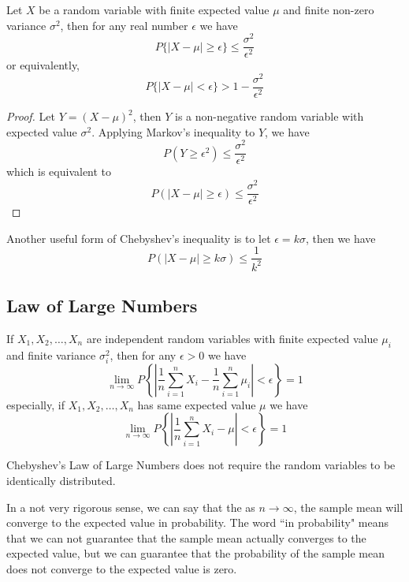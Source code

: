 \documentclass{template}
\begin{document}
\begin{theorem}
	Let $X$ be a random variable with finite expected value $\mu$ and finite non-zero variance $\sigma^2$, then
	for any real number $\epsilon$ we have
	 \[
		 P\{|X-\mu| \geq \epsilon\} \leq \frac{\sigma^2}{\epsilon^2}
	\] 
	or equivalently,
	\[
		P\{|X-\mu| < \epsilon\} > 1 - \frac{\sigma^2}{\epsilon^2}
	\] 
\end{theorem}
\begin{proof}
	Let $Y = (X-\mu)^2$, then $Y$ is a non-negative random variable with expected value $\sigma^2$.
	Applying Markov's inequality to $Y$, we have
	\[
		P(Y \geq \epsilon^2) \leq \frac{\sigma^2}{\epsilon^2}
	\] 
	which is equivalent to
	\[
		P(|X-\mu| \geq \epsilon) \leq \frac{\sigma^2}{\epsilon^2}
	\]
\end{proof}
\begin{remark}
	Another useful form of Chebyshev's inequality is to let $\epsilon = k\sigma$, then we have
	\[
		P(|X-\mu| \geq k\sigma) \leq \frac{1}{k^2}
	\] 
\end{remark}


\subsection{Law of Large Numbers}
\begin{theorem}
	If $X_1, X_2, \ldots, X_n$ are independent random variables with finite expected value $\mu_i$ and
	finite variance $\sigma_i^2$, then for any $\epsilon > 0$ we have
	\[
		\lim_{n \to \infty} P\left\{\left|\frac{1}{n}\sum_{i=1}^{n} X_i - \frac{1}{n}\sum_{i=1}^{n} \mu_i\right| < \epsilon\right\} = 1
	\]
	especially, if $X_1, X_2, \ldots, X_n$ has same expected value $\mu$ we have
	\[
		\lim_{n \to \infty} P\left\{\left|\frac{1}{n}\sum_{i=1}^{n} X_i - \mu\right| < \epsilon\right\} = 1
	\]
	\begin{remark}
		Chebyshev's Law of Large Numbers does not require the random variables to be
		identically distributed.
	\end{remark}
	\begin{remark}
		In a not very rigorous sense, we can say that the as $n \to \infty$, the sample
		mean will converge to the expected value in probability. The word
	  ``in probability" means that we can not guarantee that the sample mean actually
		converges to the expected value, but we can guarantee that the probability of
		the sample mean does not converge to the expected value is zero.
	\end{remark}
\end{theorem}
\end{document}

